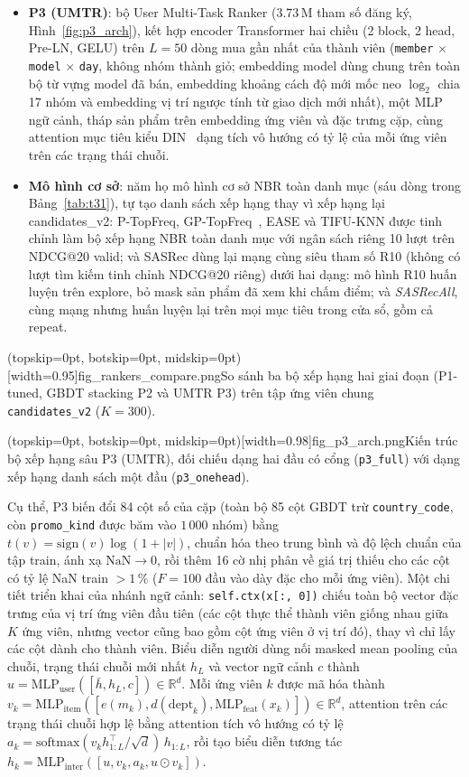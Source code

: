 \documentclass[jtehm]{ieeeaccess}
\begin{document}
\begin{itemize}
\item \textbf{P3 (UMTR)}: bộ User Multi-Task Ranker (3.73\,M tham số đăng ký, Hình~\ref{fig:p3_arch}), kết hợp encoder Transformer hai chiều (2 block, 2 head, Pre-LN, GELU) trên $L=50$ dòng mua gần nhất của thành viên (\texttt{member} $\times$ \texttt{model} $\times$ \texttt{day}, không nhóm thành giỏ; embedding model dùng chung trên toàn bộ từ vựng model đã bán, embedding khoảng cách độ mới mốc neo $\log_2$ chia 17 nhóm và embedding vị trí ngược tính từ giao dịch mới nhất), một MLP ngữ cảnh, tháp sản phẩm trên embedding ứng viên và đặc trưng cặp, cùng attention mục tiêu kiểu DIN~\cite{zhou2018din} dạng tích vô hướng có tỷ lệ của mỗi ứng viên trên các trạng thái chuỗi.
\item \textbf{Mô hình cơ sở}: năm họ mô hình cơ sở NBR toàn danh mục (sáu dòng trong Bảng~\ref{tab:t31}), tự tạo danh sách xếp hạng thay vì xếp hạng lại candidates\_v2: P-TopFreq, GP-TopFreq~\cite{li2023nbr}, EASE và TIFU-KNN được tinh chỉnh làm bộ xếp hạng NBR toàn danh mục với ngân sách riêng 10 lượt trên NDCG@20 valid; và SASRec dùng lại mạng cùng siêu tham số R10 (không có lượt tìm kiếm tinh chỉnh NDCG@20 riêng) dưới hai dạng: mô hình R10 huấn luyện trên explore, bỏ mask sản phẩm đã xem khi chấm điểm; và \emph{SASRecAll}, cùng mạng nhưng huấn luyện lại trên mọi mục tiêu trong cửa sổ, gồm cả repeat.
\end{itemize}

\Figure[t!](topskip=0pt, botskip=0pt, midskip=0pt)[width=0.95\textwidth]{fig_rankers_compare.png}{So sánh ba bộ xếp hạng hai giai đoạn (P1-tuned, GBDT stacking P2 và UMTR P3) trên tập ứng viên chung \texttt{candidates\_v2} ($K=300$).\label{fig:rankers_compare}}

\Figure[t!](topskip=0pt, botskip=0pt, midskip=0pt)[width=0.98\textwidth]{fig_p3_arch.png}{Kiến trúc bộ xếp hạng sâu P3 (UMTR), đối chiếu dạng hai đầu có cổng (\texttt{p3\_full}) với dạng xếp hạng danh sách một đầu (\texttt{p3\_onehead}).\label{fig:p3_arch}}

Cụ thể, P3 biến đổi 84 cột số của cặp (toàn bộ 85 cột GBDT trừ \texttt{country\_code}, còn \texttt{promo\_kind} được băm vào $1\,000$ nhóm) bằng $t(v) = \mathrm{sign}(v)\log(1+|v|)$, chuẩn hóa theo trung bình và độ lệch chuẩn của tập train, ánh xạ $\mathrm{NaN} \to 0$, rồi thêm 16 cờ nhị phân về giá trị thiếu cho các cột có tỷ lệ NaN train $>1\,\%$ ($F=100$ đầu vào dày đặc cho mỗi ứng viên). Một chi tiết triển khai của nhánh ngữ cảnh: \texttt{self.ctx(x[:, 0])} chiếu toàn bộ vector đặc trưng của vị trí ứng viên đầu tiên (các cột thực thể thành viên giống nhau giữa $K$ ứng viên, nhưng vector cũng bao gồm cột ứng viên ở vị trí đó), thay vì chỉ lấy các cột dành cho thành viên. Biểu diễn người dùng nối masked mean pooling của chuỗi, trạng thái chuỗi mới nhất $h_{L}$ và vector ngữ cảnh $c$ thành $u = \mathrm{MLP}_{\mathrm{user}}([\bar{h}, h_L, c]) \in \mathbb{R}^d$. Mỗi ứng viên $k$ được mã hóa thành $v_k = \mathrm{MLP}_{\mathrm{item}}([e(m_k), d(\mathrm{dept}_k), \mathrm{MLP}_{\mathrm{feat}}(x_k)]) \in \mathbb{R}^d$, attention trên các trạng thái chuỗi hợp lệ bằng attention tích vô hướng có tỷ lệ $a_k = \mathrm{softmax}(v_k h_{1:L}^\top / \sqrt{d})\,h_{1:L}$, rồi tạo biểu diễn tương tác $h_k = \mathrm{MLP}_{\mathrm{inter}}([u, v_k, a_k, u \odot v_k])$.
\end{document}
